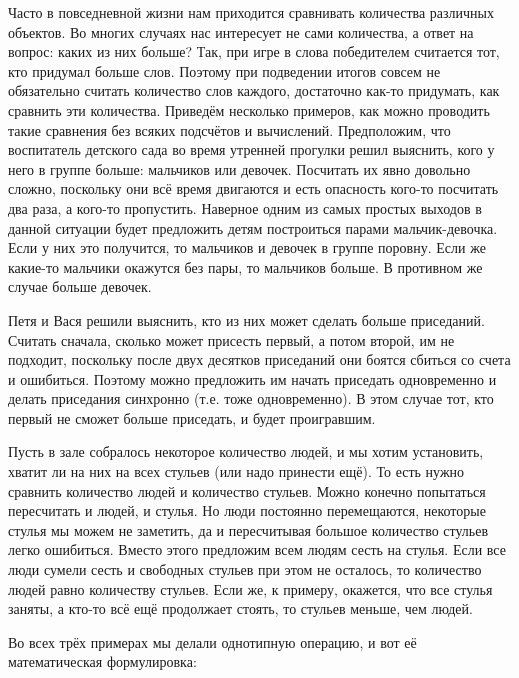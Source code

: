 \documentclass[12pt,a4paper]{article}
\begin{document}
\smallskip

{
\small

Часто в повседневной жизни нам приходится сравнивать количества различных объектов.
Во многих случаях нас интересует не сами количества, а ответ на вопрос: каких из них больше?
Так, при игре в слова победителем считается тот, кто придумал больше слов.
Поэтому при подведении итогов совсем не обязательно считать количество слов каждого, достаточно как-то придумать, как сравнить эти количества.
Приведём несколько примеров, как можно проводить такие сравнения без всяких подсчётов и вычислений.
Предположим, что воспитатель детского сада во время утренней прогулки решил выяснить, кого у него в группе больше: мальчиков или девочек.
Посчитать их явно довольно сложно, поскольку они всё время двигаются и есть опасность кого-то посчитать два раза, а кого-то пропустить.
Наверное одним из самых простых выходов в данной ситуации будет предложить детям построиться парами мальчик-девочка.
Если у них это получится, то мальчиков и девочек в группе поровну.
Если же какие-то мальчики окажутся без пары, то мальчиков больше. В противном же случае больше девочек.

Петя и Вася решили выяснить, кто из них может сделать больше приседаний.
Считать сначала, сколько может присесть первый, а потом второй, им не подходит, поскольку после двух десятков приседаний они боятся сбиться со счета и ошибиться.
Поэтому можно предложить им начать приседать одновременно и делать приседания синхронно (т.е. тоже одновременно).
В этом случае тот, кто первый не сможет больше приседать, и будет проигравшим.

Пусть в зале собралось некоторое количество людей, и мы хотим установить, хватит ли на них на всех стульев (или надо принести ещё).
То есть нужно сравнить количество людей и количество стульев.
Можно конечно попытаться пересчитать и людей, и стулья.
Но люди постоянно перемещаются, некоторые стулья мы можем не заметить, да и пересчитывая большое количество стульев легко ошибиться.
Вместо этого предложим всем людям сесть на стулья.
Если все люди сумели сесть и свободных стульев при этом не осталось, то количество людей равно количеству стульев.
Если же, к примеру, окажется, что все стулья заняты, а кто-то всё ещё продолжает стоять, то стульев меньше, чем людей.

Во всех трёх примерах мы делали однотипную операцию, и вот её математическая формулировка:

}
\end{document}
